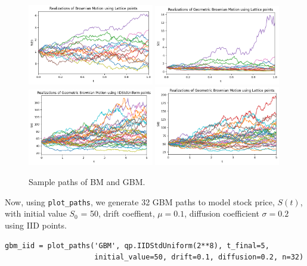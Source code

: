 \documentclass{article}
\begin{document}
\begin{figure}[t!]
\centering
\includegraphics[width=0.49\textwidth]{images/figure_1.png}
\includegraphics[width=0.49\textwidth]{images/figure_2.png}\\
\includegraphics[width=0.49\textwidth]{images/figure_3.png}
\includegraphics[width=0.49\textwidth]{images/figure_4.png}
\caption{Sample paths of BM and GBM.}
\end{figure}

Now, using \texttt{plot\_paths}, we generate 32 GBM paths to model stock price, $S(t)$, with initial value $S_0$ = 50, drift coeffient, $\mu = 0.1$, diffusion coefficient $\sigma = 0.2$ using IID points.


\begin{verbatim}
gbm_iid = plot_paths('GBM', qp.IIDStdUniform(2**8), t_final=5, 
                     initial_value=50, drift=0.1, diffusion=0.2, n=32)
\end{verbatim}
\end{document}
